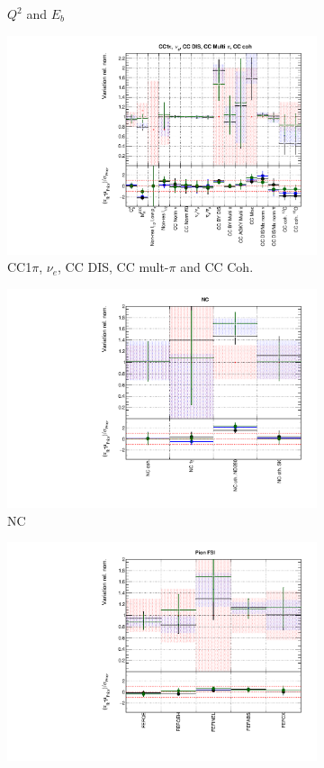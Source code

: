 \begin{figure}
\begin{subfigure}{0.49\textwidth}
  \caption{$Q^2$ and $E_b$}
\end{subfigure}
\begin{subfigure}{0.49\textwidth}
  \centering
  \includegraphics[width=0.9\linewidth]{figs/fhcrhcfitsxsec_3}
  \caption{CC1$\pi$, $\nu_e$, CC DIS, CC mult-$\pi$ and CC Coh.}
\end{subfigure}
\begin{subfigure}{0.49\textwidth}
  \centering
  \includegraphics[width=0.9\linewidth]{figs/fhcrhcfitsxsec_4}
  \caption{NC}
\end{subfigure}
\begin{subfigure}{0.49\textwidth}
  \centering
  \includegraphics[width=0.9\linewidth]{figs/fhcrhcfitsxsec_5}

\end{subfigure}
\end{figure}
